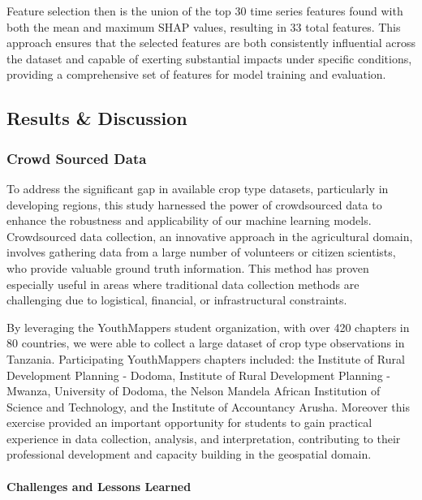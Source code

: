 \documentclass[
  journal,
  twocolumn]{IEEEtran}
\begin{document}
Feature selection then is the union of the top 30 time series features
found with both the mean and maximum SHAP values, resulting in 33 total
features. This approach ensures that the selected features are both
consistently influential across the dataset and capable of exerting
substantial impacts under specific conditions, providing a comprehensive
set of features for model training and evaluation.

\hypertarget{results-discussion}{%
\subsection{Results \& Discussion}\label{results-discussion}}

\hypertarget{crowd-sourced-data}{%
\subsubsection{Crowd Sourced Data}\label{crowd-sourced-data}}

To address the significant gap in available crop type datasets,
particularly in developing regions, this study harnessed the power of
crowdsourced data to enhance the robustness and applicability of our
machine learning models. Crowdsourced data collection, an innovative
approach in the agricultural domain, involves gathering data from a
large number of volunteers or citizen scientists, who provide valuable
ground truth information. This method has proven especially useful in
areas where traditional data collection methods are challenging due to
logistical, financial, or infrastructural constraints.

By leveraging the YouthMappers student organization, with over 420
chapters in 80 countries, we were able to collect a large dataset of
crop type observations in Tanzania. Participating YouthMappers chapters
included: the Institute of Rural Development Planning - Dodoma,
Institute of Rural Development Planning - Mwanza, University of Dodoma,
the Nelson Mandela African Institution of Science and Technology, and
the Institute of Accountancy Arusha. Moreover this exercise provided an
important opportunity for students to gain practical experience in data
collection, analysis, and interpretation, contributing to their
professional development and capacity building in the geospatial domain.

\hypertarget{challenges-and-lessons-learned}{%
\paragraph{Challenges and Lessons
Learned}\label{challenges-and-lessons-learned}}
\end{document}
